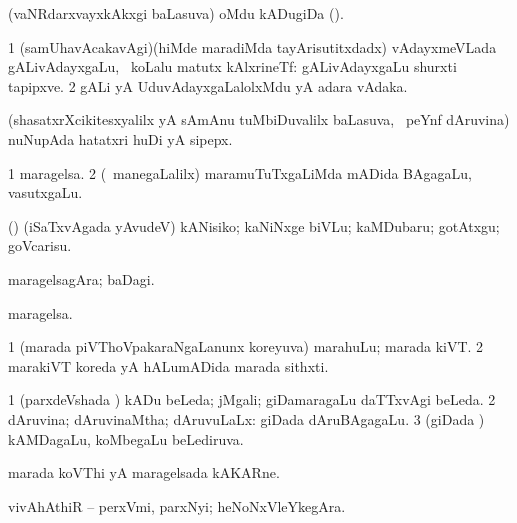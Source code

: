 {{{{{{{\bentry
{} 
\gl{\nA}
\expl{}
\bmng
(vaNRdarxvayxkAkxgi baLasuva) oMdu kADugiDa (). 
\emng
\eentry

\bentry
{} 
\gl{\nA}
\expl{}
\bmng
\bnum
\num{1} (samUhavAcakavAgi)(hiMde maradiMda tayArisutitxdadx) vAdayxmeVLada gALivAdayxgaLu, \udA\ koLalu matutx kAlxrineTf:  gALivAdayxgaLu shurxti tapipxve. 
\num{2} gALi yA UduvAdayxgaLalolxMdu yA adara vAdaka. 
\enum
\emng
\eentry

\bentry
{} 
\gl{\nA}
\expl{}
\bmng
(shasatxrXcikitesxyalilx yA sAmAnu tuMbiDuvalilx baLasuva, \sA\ peYnf dAruvina) nuNupAda hatatxri huDi yA sipepx. 
\emng
\eentry

\bentry
{} 
\gl{\nA}
\expl{}
\bmng
\bnum
\num{1} maragelsa. 
\num{2} (\kanmu\ manegaLalilx) maramuTuTxgaLiMda mADida BAgagaLu, vasutxgaLu. 
\enum
\emng

\noindent
\gl{\pagu}
\expl{}
\bmng
{} (\AmA) (iSaTxvAgada yAvudeV) kANisiko; kaNiNxge biVLu; kaMDubaru; gotAtxgu; goVcarisu. 
\emng
\eentry

\bentry 
{} 
\gl{\nA}
\expl{}
\bmng
maragelsagAra; baDagi. 
\emng
\eentry

\bentry
{} 
\gl{\nA}
\expl{}
\bmng
maragelsa. 
\emng
\eentry

\bentry
{} 
\gl{\nA}
\expl{}
\bmng
\bnum
\num{1} (marada piVThoVpakaraNgaLanunx koreyuva) marahuLu; marada kiVT. 
\num{2} marakiVT koreda yA hALumADida marada sithxti. 
\enum
\emng
\eentry

\bentry
{} 
\gl{\gu}
\bmng
\bnum
\num{1} (parxdeVshada \vi) kADu beLeda; jMgali; giDamaragaLu daTTxvAgi beLeda. 
\num{2} dAruvina; dAruvinaMtha; dAruvuLaLx:  giDada dAruBAgagaLu. 
\num{3} (giDada \vi) kAMDagaLu, koMbegaLu beLediruva. 
\enum
\emng

\noindent
\gl{\pagu}
\expl{}
\bmng
{} 
\emng
\eentry

\bentry
{} 
\gl{\nA}
\expl{}
\bmng
marada koVThi yA maragelsada kAKARne. 
\emng
\eentry

\bentry
{} 
\gl{\nA}
\expl{}
\bmng
vivAhAthiR -- perxVmi, parxNyi; heNoNxVleYkegAra. 
\emng
\eentry

}}}}}}}
